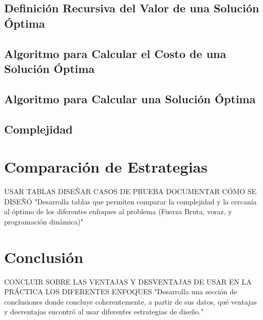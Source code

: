 \documentclass[letterpaper,10pt]{article}
\begin{document}
\subsection{Definición Recursiva del Valor de una Solución Óptima}
\label{subsec:definicion_solucion_optima}
\subsection{Algoritmo para Calcular el Costo de una Solución Óptima}
\label{subsec:algoritmo_costo_solucion_optima}
\subsection{Algoritmo para Calcular una Solución Óptima}
\label{subsec:algoritmo_solucion_optima}
\subsection{Complejidad}
\label{subsec:complejidad_programacion_dinamica}

\section{Comparación de Estrategias}
\label{sec:comparacion_estrategias}
USAR TABLAS DISEÑAR CASOS DE PRUEBA DOCUMENTAR CÓMO SE DISEÑÓ
"Desarrolla tablas que permiten comparar la complejidad y la cercanía al óptimo de los diferentes enfoques al problema (Fuerza Bruta, voraz, y programación dinámica)"

\section{Conclusión}
\label{sec:conclusion}
CONCLUIR SOBRE LAS VENTAJAS Y DESVENTAJAS DE USAR EN LA PRÁCTICA LOS DIFERENTES ENFOQUES
"Desarrolla una sección de conclusiones donde concluye coherentemente, a partir de sus datos, qué ventajas y desventajas encontró al usar diferentes estrategias de diseño."
\end{document}
